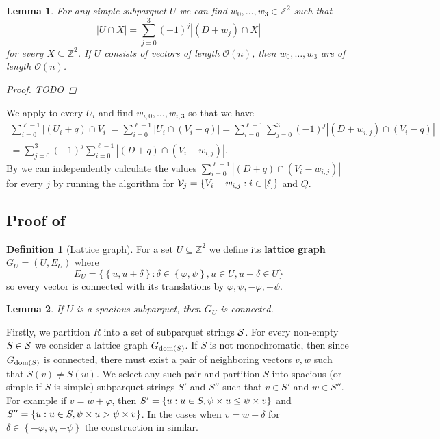 \documentclass[11pt]{article}
\newcommand{\Z}{\mathbb{Z}}
\renewcommand{\O}{\mathcal{O}}
\renewcommand{\phi}{\varphi}
\newcommand{\set}[1]{\left\lbrace #1 \right\rbrace}
\newcommand{\bigset}[1]{\big \lbrace #1 \big \rbrace}
\newcommand{\eq}[1]{\begin{align*} #1 \end{align*}}
\theoremstyle{plain}
\newtheorem{lemma}{Lemma}
\theoremstyle{definition}
\newtheorem{definition}{Definition}
\theoremstyle{remark}
\begin{document}
\begin{lemma}\label{primitive}
	For any simple subparquet $U$ we can find $w_0, \dots, w_3 \in \Z^2$ such that
	$$ |U \cap X| = \sum_{j = 0}^3 (-1)^j |(D + w_j) \cap X|$$
	for every $X \subseteq \Z^2$.
	If $U$ consists of vectors of length $\O(n)$, then $w_0, \dots, w_3$ are of length $\O(n)$.
	\begin{proof}
		TODO
	\end{proof}
\end{lemma}

We apply  to every $U_i$ and find $w_{i, 0}, \dots, w_{i, 3}$ so that we have
\eq{
	\sum_{i = 0}^{\ell - 1}|(U_i + q) \cap V_i| 
= \sum_{i = 0}^{\ell - 1}|U_i \cap (V_i - q)| 
= \sum_{i = 0}^{\ell - 1} \sum_{j = 0}^3 (-1)^j |(D + w_{i, j}) \cap (V_i - q)| \\
= \sum_{j = 0}^3 (-1)^j \sum_{i = 0}^{\ell - 1} |(D + q) \cap (V_i - w_{i, j})|.
}
By  we can independently calculate the values $\sum_{i = 0}^{\ell - 1} |(D + q) \cap (V_i - w_{i, j})|$ for every $j$ by running the algorithm for $\V_j = \set{V_i - w_{i, j} : i \in [\ell]}$ and $Q$.


\subsection{Proof of } \label{parquet_decomposition_proof}


\begin{definition}[Lattice graph]
	For a set $U \subseteq \Z^2$ we define its \textbf{lattice graph} $G_U = (U, E_U)$ where
	$$ E_U = \bigset{\set{u, u + \delta} : \delta \in \set{\phi, \psi}, u \in U, u + \delta \in U} $$ 
	so every vector is connected with its translations by $\phi, \psi, -\phi, -\psi$.
\end{definition}


\begin{lemma}
	If $U$ is a spacious subparquet, then $G_U$ is connected.
\end{lemma}


Firstly, we partition $R$ into a set of subparquet strings $\S$.
For every non-empty $S \in \S$ we consider a lattice graph $G_{\d{S}}$. If $S$ is not monochromatic, then since $G_{\d{S}}$ is connected, there must exist a pair of neighboring vectors $v, w$ such that $S(v) \neq S(w)$.
We select any such pair and partition $S$ into spacious (or simple if $S$ is simple) subparquet strings $S'$ and $S''$ such that $v \in S'$ and $w \in S''$.
For example if $v = w + \phi$, then $S' = \set{u : u \in S, \s{u} \le \s{v}}$ and $S'' = \set{u : u \in S, \s{u} > \s{v}}$.
In the cases when $v = w + \delta$ for $\delta \in \set{-\phi, \psi, -\psi}$ the construction in similar.
\end{document}
